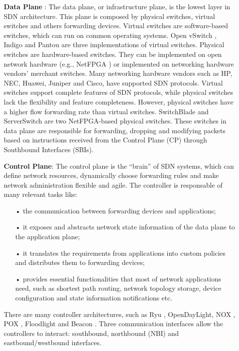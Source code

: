 \begin{itemize}
\item[] \textbf{Data Plane} : The data plane, or infrastructure plane, is the lowest layer in SDN architecture. This plane is composed by physical switches, virtual switches and others forwarding devices. Virtual switches are software-based switches, which can run on common operating systems. Open vSwitch \cite{OVS}, Indigo \cite{Indigo} and Pantou \cite{Pantou} are three implementations of virtual switches. Physical switches are hardware-based switches. They can be implemented on open network hardware (e.g., NetFPGA \cite{Lockwood2007}) or implemented on networking hardware vendors’ merchant switches. Many networking hardware vendors such as HP, NEC, Huawei, Juniper and Cisco, have supported SDN protocols. Virtual switches support complete features of SDN protocols, while physical switches lack the flexibility and feature completeness. However, physical switches have a higher flow forwarding rate than virtual switches.  SwitchBlade \cite{Anwer2010} and ServerSwitch \cite{Lu2011} are two NetFPGA-based physical switches.
These switches in data plane are responsible for forwarding, dropping and modifying packets based on instructions received from the Control Plane (CP) through Southbound Interfaces (SBIs).
\item[] \textbf{Control Plane}: The control plane is the “brain” of SDN systems, which can define network resources, dynamically choose forwarding rules and make network administration flexible and agile. The controller is responsable of many relevant tasks like:
\begin{itemize}
\item[•] the communication between forwarding devices and applications;
\item[•] it exposes and abstracts network state information of the data plane to the application plane;
\item[•] it translates the requirements from applications into custom policies and distributes them to forwarding devices;
\item[•] provides essential functionalities that most of network applications need, such as shortest path routing, network topology storage, device configuration and state information notifications etc.
\end{itemize}
There are many controller architectures, such as Ryu \cite{RYU}, OpenDayLight, \cite{Medved2014} NOX \cite{NOX}, POX \cite{POX}, Floodlight \cite{Floodlight} and Beacon \cite{Erickson2013}. Three communication interfaces allow the controllers to interact: southbound, northbound (NBI) and eastbound/westbound interfaces.

\end{itemize}
